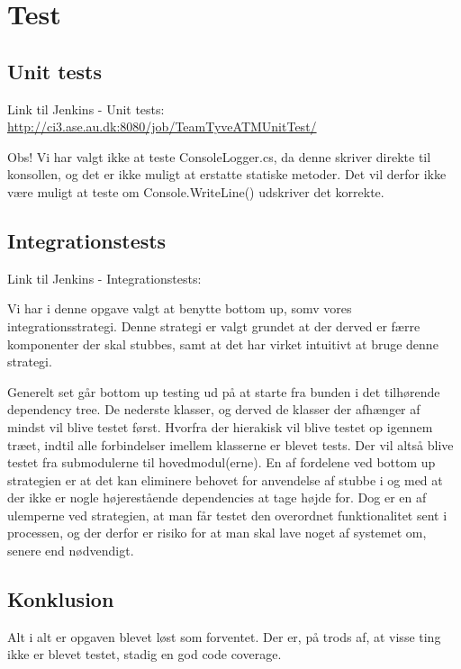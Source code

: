 \chapter{Test}
\section{Unit tests}
Link til Jenkins - Unit tests: \url{http://ci3.ase.au.dk:8080/job/TeamTyveATMUnitTest/} \newline \newline

Obs! Vi har valgt ikke at teste ConsoleLogger.cs, da denne skriver direkte til konsollen, og det er ikke muligt at erstatte statiske metoder. Det vil derfor ikke være muligt at teste om Console.WriteLine() udskriver det korrekte. 

\section{Integrationstests}
Link til Jenkins - Integrationstests: \newline \newline

Vi har i denne opgave valgt at benytte bottom up, somv vores integrationsstrategi.\tabularnewline
Denne strategi er valgt grundet at der derved er færre komponenter der skal stubbes, samt at det har virket intuitivt at bruge denne strategi.

Generelt set går bottom up testing ud på at starte fra bunden i det tilhørende dependency tree. De nederste klasser, og derved de klasser der afhænger af mindst vil blive testet først. Hvorfra der hierakisk vil blive testet op igennem træet, indtil alle forbindelser imellem klasserne er blevet tests. Der vil altså blive testet fra submodulerne til hovedmodul(erne).
En af fordelene ved bottom up strategien er at det kan eliminere behovet for anvendelse af stubbe i og med at der ikke er nogle højerestående dependencies at tage højde for. Dog er en af ulemperne ved strategien, at man får testet den overordnet funktionalitet sent i processen, og der derfor er risiko for at man skal lave noget af systemet om, senere end nødvendigt. 


\section{Konklusion}
Alt i alt er opgaven blevet løst som forventet. Der er, på trods af, at visse ting ikke er blevet testet, stadig en god code coverage.